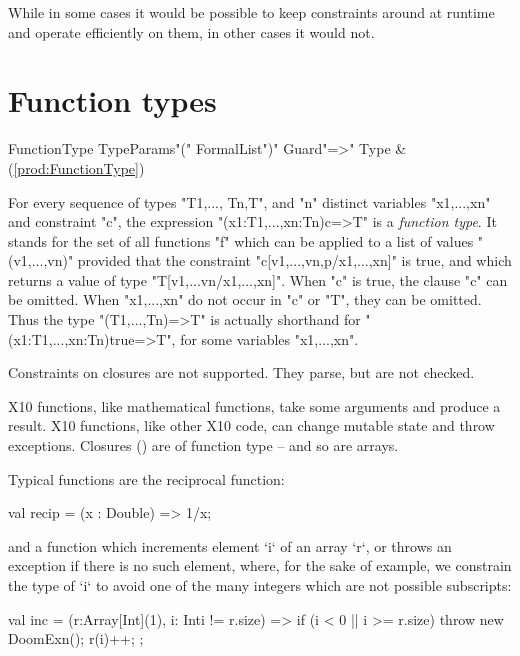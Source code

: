 While in some cases it would be possible to keep constraints around at runtime
and operate efficiently on them, in other cases it would not.  






\section{Function types}
\label{FunctionTypes}
\label{FunctionType}

\begin{bbgrammar}
        FunctionType \: TypeParams\opt \xcd"(" FormalList\opt \xcd")" Guard\opt \xcd"=>" Type & (\ref{prod:FunctionType}) \\
\end{bbgrammar}


For every sequence of types \xcd"T1,..., Tn,T", and \xcd"n" distinct variables
\xcd"x1,...,xn" and constraint \xcd"c", the expression
\xcd"(x1:T1,...,xn:Tn){c}=>T" is a \emph{function type}. It stands for
 the set of all functions \xcd"f" which can be applied to a
 list of values \xcd"(v1,...,vn)" provided that the constraint
 \xcd"c[v1,...,vn,p/x1,...,xn]" is true, and which returns a value of
 type \xcd"T[v1,...vn/x1,...,xn]". When \xcd"c" is true, the clause \xcd"{c}" can be
 omitted. When \xcd"x1,...,xn" do not occur in \xcd"c" or \xcd"T", they can be
 omitted. Thus the type \xcd"(T1,...,Tn)=>T" is actually shorthand for
 \xcd"(x1:T1,...,xn:Tn){true}=>T", for some variables \xcd"x1,...,xn".

\limitationx{}
Constraints on closures are not supported.  They parse, but are not checked.

X10 functions, like mathematical functions, take some arguments and produce a
result.  X10 functions, like other X10 code, can change mutable state and
throw exceptions.  Closures ()  are of function type -- and so
are arrays.


\begin{ex}Typical functions are the reciprocal function: 
\begin{xten}
val recip = (x : Double) => 1/x;
\end{xten}
and a function which increments  element \xcd`i` of an array \xcd`r`, or throws an exception
if there is no such element, where, for the sake of example, we constrain the
type of \xcd`i` to avoid one of the many integers which are not possible subscripts:  
\begin{xten}
val inc = (r:Array[Int](1), i: Int{i != r.size}) => {
  if (i < 0 || i >= r.size) throw new DoomExn();
  r(i)++;
};
\end{xten}
\end{ex}


